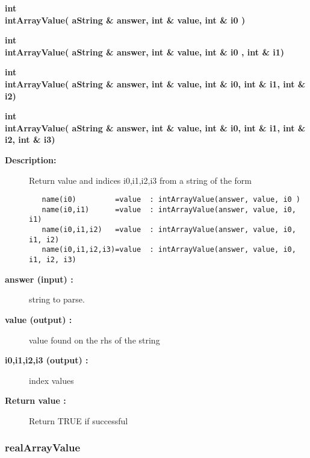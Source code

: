 \begin{flushleft} \textbf{%
int  \\ 
\settowidth{\NameListIncludeArgIndent}{intArrayValue(}%
intArrayValue( aString \& answer, int \& value, int \& i0 )
}\end{flushleft}

 
\begin{flushleft} \textbf{%
int  \\ 
\settowidth{\NameListIncludeArgIndent}{intArrayValue(}%
intArrayValue( aString \& answer, int \& value, int \& i0 , int \& i1)
}\end{flushleft}

 
\begin{flushleft} \textbf{%
int  \\ 
\settowidth{\NameListIncludeArgIndent}{intArrayValue(}%
intArrayValue( aString \& answer, int \& value, int \& i0, int \& i1, int \& i2)
}\end{flushleft}

 
\begin{flushleft} \textbf{%
int  \\ 
\settowidth{\NameListIncludeArgIndent}{intArrayValue(}%
intArrayValue( aString \& answer, int \& value, int \& i0, int \& i1, int \& i2, int \& i3)
}\end{flushleft}
\begin{description}
\item[{\bf Description:}] 
 Return value and indices i0,i1,i2,i3 from a string of the form
 \begin{verbatim}
   name(i0)         =value  : intArrayValue(answer, value, i0 )
   name(i0,i1)      =value  : intArrayValue(answer, value, i0, i1)
   name(i0,i1,i2)   =value  : intArrayValue(answer, value, i0, i1, i2)
   name(i0,i1,i2,i3)=value  : intArrayValue(answer, value, i0, i1, i2, i3)
 \end{verbatim}
\item[{\bf answer (input) :}]  string to parse.
\item[{\bf value (output) :}]  value found on the rhs of the string
\item[{\bf i0,i1,i2,i3 (output) :}]  index values
\item[{\bf Return value :}]   Return TRUE if successful
\end{description}
\subsubsection{realArrayValue}
 
